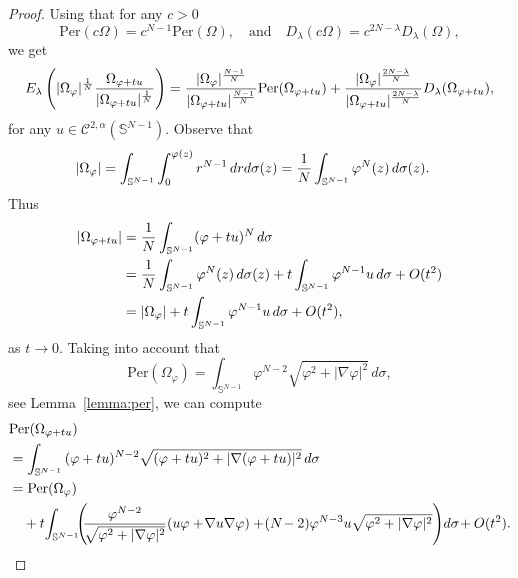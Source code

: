 \documentclass[10pt,a4paper]{amsart}
\newcommand{\Sn}{\mathbb{S}^{N-1}}
\begin{document}
\begin{proof}

Using that for any $c>0$
\[
{\mbox {Per}} (c \Omega) = c^{N-1 }
{\mbox {Per}} ( \Omega), \quad \text{and}\quad D_\lambda(c\Omega)=c^{2N-\lambda}D_\lambda(\Omega),
\]
we get
\[
E_\lambda \left( |\Omega_\varphi |^{1\over N}  {\Omega_{\varphi +t u} \over |\Omega_{\varphi+tu}|^{1\over N}} \right) =
          { |\Omega_\varphi |^{N-1 \over N} \over |\Omega_{\varphi+tu}|^{N-1\over N}} {\mbox {Per}} (\Omega_{\varphi + t u})+ { |\Omega_\varphi |^{2N-\lambda \over N} \over |\Omega_{\varphi+tu}|^{2N-\lambda\over N}}D_\lambda(\Omega_{\varphi + t u}),
  \]
  for any $u\in\mathcal C^{2,\alpha}(\Sn)$.
    Observe that
    \begin{align*}
        |\Omega_{\varphi} | &= \int_{\mathbb S^{N-1}} \int_0^{\varphi (z)} r^{N-1}\, dr d\sigma(z) = {1\over N} \int_{\mathbb S^{N-1} }
        \varphi^N (z)\, d\sigma(z).
    \end{align*}
    Thus
  \begin{align*}
        |\Omega_{\varphi +tu} | &=   {1\over N} \int_{\mathbb S^{N-1} }
        (\varphi  + t u  )^N \,  d \sigma \\
        &=   {1\over N} \int_{\mathbb S^{N-1} }
        \varphi^N (z)\,  d \sigma(z) + t \int_{\mathbb S^{N-1}} \varphi^{N-1}  u  \,  d \sigma + O (t^2)\\
         &=   |\Omega_{\varphi } | + t \int_{\mathbb S^{N-1}} \varphi^{N-1}  u \,  d \sigma + O (t^2),
    \end{align*}    
    as $t \to 0$.
Taking into account that
\begin{equation}
\label{formula-perimetro}
     {\mbox {Per}} (\Omega_{\varphi })=\int_{\mathbb S^{N-1}} \varphi^{N-2} \sqrt{\varphi^2 + |\nabla \varphi |^2} \, d\sigma,
\end{equation}
see Lemma~\ref{lemma:per}, we can compute
\begin{align*}
    &{\mbox {Per}} (\Omega_{\varphi +tu})\\
    &= \int_{\mathbb S^{N-1} }\, (\varphi + t u )^{N-2} \sqrt{ (\varphi + t u )^2 + |\nabla (\varphi + t u)|^2}  \, d \sigma\\
    &={\mbox {Per}} (\Omega_{\varphi})\\
     &\quad+ t \! \int_{\mathbb S^{N-1}\!\!\!} \left(\! \!{\varphi^{N-2} \over  \sqrt{ \varphi^2 + |\nabla \varphi|^2}} (u \varphi +\! \nabla u \nabla \varphi) +\! (N\!-2) \varphi^{N-3} u  \sqrt{ \varphi^2 + |\nabla \varphi|^2}\right) \!d \sigma\! + O(t^2).
\end{align*}

\end{proof}
\end{document}
